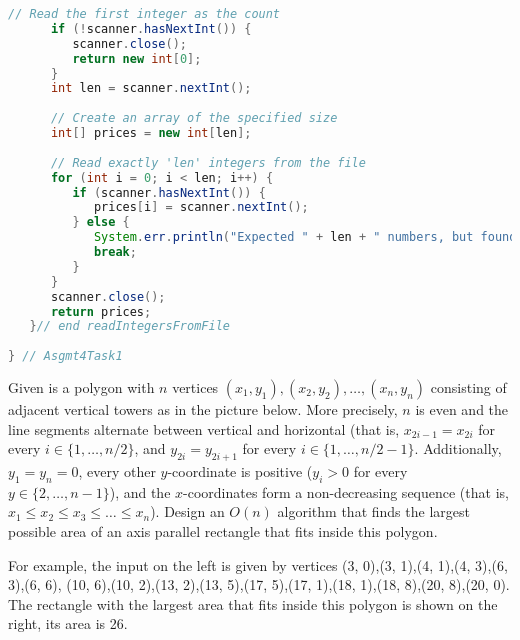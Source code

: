 \documentclass[11pt]{article}
\begin{document}
\begin{lstlisting}[language=Java]
      // Read the first integer as the count
      if (!scanner.hasNextInt()) {
         scanner.close();
         return new int[0];
      }
      int len = scanner.nextInt();
      
      // Create an array of the specified size
      int[] prices = new int[len];
      
      // Read exactly 'len' integers from the file
      for (int i = 0; i < len; i++) {
         if (scanner.hasNextInt()) {
            prices[i] = scanner.nextInt();
         } else {
            System.err.println("Expected " + len + " numbers, but found fewer.");
            break;
         }
      }
      scanner.close();
      return prices;
   }// end readIntegersFromFile
   
} // Asgmt4Task1

\end{lstlisting}
\pagebreak






































Given is a polygon with $n$ vertices  $(x_1, y_1),(x_2, y_2), \ldots,(x_n, y_n)$  consisting of adjacent vertical towers as in the picture below.
More precisely, $n$ is even and the line segments alternate between vertical and horizontal (that
is, $x_{2i - 1} = x_{2i}$
for every $i \in \{1, \ldots, n/2\}$, and $y_{2i} = y_{2i+1}$ for every $i \in \{1, \ldots, n/2 - 1\}$.
Additionally, $y_1 = y_n = 0$, every other $y$-coordinate is positive ($y_i > 0$ for every $y \in
\{2, \ldots, n - 1\}$), and the $x$-coordinates form a non-decreasing sequence (that is, $x_1 \leq x_2 \leq
x_3 \leq \ldots  \leq x_n$). Design an $O(n)$ algorithm that finds the largest possible area of an axis parallel
rectangle that fits inside this polygon.   

For example, the input on the left is given by vertices (3, 0),(3, 1),(4, 1),(4, 3),(6, 3),(6, 6),
(10, 6),(10, 2),(13, 2),(13, 5),(17, 5),(17, 1),(18, 1),(18, 8),(20, 8),(20, 0). The rectangle with
the largest area that fits inside this polygon is shown on the right, its area is 26.
\bigskip
\end{document}
